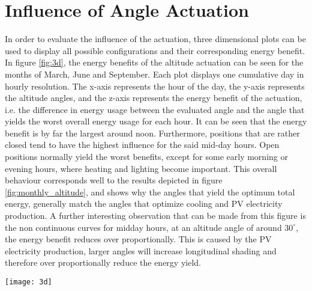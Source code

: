 \section{Influence of Angle Actuation}
	In order to evaluate the influence of the actuation, three dimensional plots can be used to display all possible configurations and their corresponding energy benefit. In figure \ref{fig:3d}, the energy benefits of the altitude actuation can be seen for the months of March, June and September. Each plot displays one cumulative day in hourly resolution. The x-axis represents the hour of the day, the y-axis represents the altitude angles, and the z-axis represents the energy benefit of the actuation, i.e. the difference in energy usage between the evaluated angle and the angle that yields the worst overall energy usage for each hour. It can be seen that the energy benefit is by far the largest around noon. Furthermore, positions that are rather closed tend to have the highest influence for the said mid-day hours. Open positions normally yield the worst benefits, except for some early morning or evening hours, where heating and lighting become important. This overall behaviour corresponds well to the results depicted in figure \ref{fig:monthly_altitude}, and shows why the angles that yield the optimum total energy, generally match the angles that optimize cooling and PV electricity production. A further interesting observation that can be made from this figure is the non continuous curves for midday hours, at an altitude angle of around $30^{\circ}$, the energy benefit reduces over proportionally. This is caused by the PV electricity production, larger angles will increase longitudinal shading and therefore over proportionally reduce the energy yield. 

	\begin{figure*}
		\begin{center}
		\texttt{[image: 3d]}
		\caption{Energy benefits of the altitude actuation for the months of March, June and September. Each plot displays one cumulative day in hourly resolution. The x-axis represents the hour of the day, the y-axis represents the altitude angles, and the z-axis represents the energy benefit of the actuation, i.e. the difference in energy usage between the evaluated angle and the angle that yields the worst overall energy usage for each hour.}
		\label{fig:3d}
		\end{center}
	\end{figure*}


